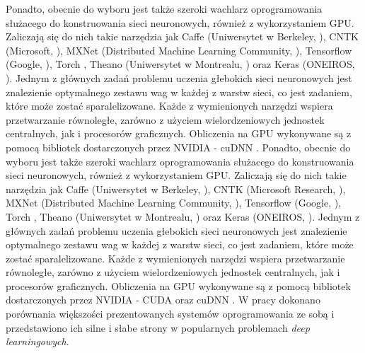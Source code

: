 \documentclass[12pt,a4paper,twoside]{article}
\begin{document}
Ponadto, obecnie do wyboru jest także szeroki wachlarz oprogramowania służacego do konstruowania sieci neuronowych, również z wykorzystaniem GPU. Zaliczają się do nich takie narzędzia jak Caffe (Uniwersytet w Berkeley, \citet{jia2014}), CNTK (Microsoft, \citet{yu2014}), MXNet (Distributed Machine Learning Community, \citet{chen2015}), Tensorflow (Google, \citet{abadi2016}), Torch \citep{collobert2011}, Theano (Uniwersytet w Montrealu, \citet{alrhou2016}) oraz Keras (ONEIROS, \citet{chollet2015}). Jednym z głównych zadań problemu uczenia głebokich sieci neuronowych jest znalezienie optymalnego zestawu wag w każdej z warstw sieci, co jest zadaniem, które może zostać sparalelizowane. Każde z wymienionych narzędzi wspiera przetwarzanie równoległe, zarówno z użyciem wielordzeniowych jednostek centralnych, jak i procesorów graficznych. Obliczenia na GPU wykonywane są z pomocą bibliotek dostarczonych przez NVIDIA - cuDNN \citep{chetlur2014}.
Ponadto, obecnie do wyboru jest także szeroki wachlarz oprogramowania służacego do konstruowania sieci neuronowych, również z wykorzystaniem GPU. Zaliczają się do nich takie narzędzia jak Caffe (Uniwersytet w Berkeley, \citet{jia2014}), CNTK (Microsoft Research, \citet{yu2014}), MXNet (Distributed Machine Learning Community, \citet{chen2015}), Tensorflow (Google, \citet{abadi2016}), Torch \citep{collobert2011}, Theano (Uniwersytet w Montrealu, \citet{alrfou2016}) oraz Keras (ONEIROS, \citet{chollet2015}). Jednym z głównych zadań problemu uczenia głebokich sieci neuronowych jest znalezienie optymalnego zestawu wag w każdej z warstw sieci, co jest zadaniem, które może zostać sparalelizowane. Każde z wymienionych narzędzi wspiera przetwarzanie równoległe, zarówno z użyciem wielordzeniowych jednostek centralnych, jak i procesorów graficznych.
Obliczenia na GPU wykonywane są z pomocą bibliotek dostarczonych przez NVIDIA - CUDA oraz cuDNN \citep{chetlur2014}.
W pracy \citet{shi2016} dokonano porównania większości prezentowanych systemów oprogramowania ze sobą i przedstawiono ich silne i słabe strony w popularnych problemach \textit{deep learningowych}.
\noindent
\end{document}
